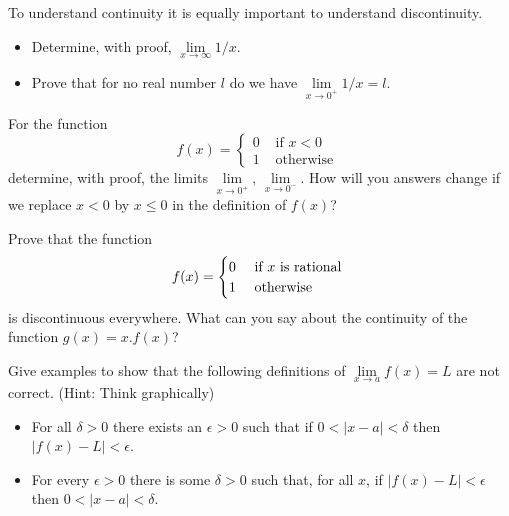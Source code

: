 \documentclass[9pt, a4paper, oneside]{amsart}
\begin{document}
To understand continuity it is equally important to understand discontinuity.
\begin{questions}[resume]
	\item
	\begin{itemize}
		\item Determine, with proof, $\lim \limits_{x \rightarrow \infty} 1/x$.
		\item Prove that for no real number $l$ do we have $\lim \limits_{x \rightarrow 0^+} 1/x = l$.
	\end{itemize}

	\item For the function 	$$ f(x) = \begin{cases} 0 & \mbox{ if } x < 0 \\ 1 & \mbox{ otherwise }\end{cases}$$
	determine, with proof, the limits $ \lim \limits_{x \rightarrow 0^+}$, $ \lim \limits_{x \rightarrow 0^-}$. How will you answers change if we replace $ x<0$ by $ x\le 0$ in the definition of $ f(x)$?
	\item Prove that the function
	$$ f(x) = \begin{cases} 0 & \mbox{ if $ x$ is rational } \\ 1 & \mbox{ otherwise }\end{cases}$$
	is discontinuous everywhere. What can you say about the continuity of the function $ g(x) = x .f(x)$?

	\item Give examples to show that the following definitions of $\lim \limits _ {x \rightarrow a} f(x) = L$ are not correct. (Hint: Think graphically)
	\begin{itemize}
		\item For all $ \delta > 0$ there exists an $ \epsilon > 0$ such that if $ 0<|x-a|< \delta$ then $ |f(x) - L|< \epsilon$.
		\item For every $\epsilon > 0$ there is some $\delta > 0$ such that, for all $x$, if $|f(x) - L| < \epsilon$ then $0 < |x - a| < \delta$.
	\end{itemize}
\end{questions}
\end{document}
